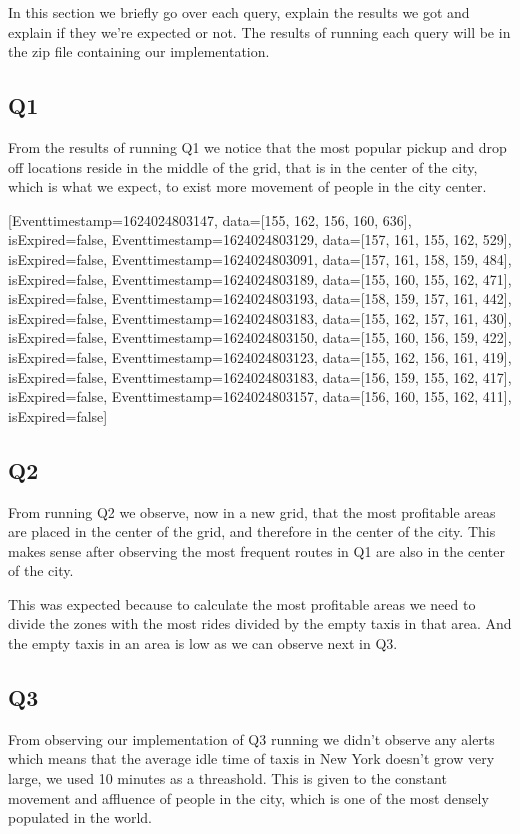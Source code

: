 In this section we briefly go over each query, explain the results we got and explain if they we're expected or not. The results of running each query will be in the zip file containing our implementation.

\subsection{Q1}
From the results of running Q1 we notice that the most popular pickup and drop off locations reside in the middle of the grid, that is in the center of the city, which is what we expect, to exist more movement of people in the city center.

[Event{timestamp=1624024803147, data=[155, 162, 156, 160, 636], isExpired=false}, 
Event{timestamp=1624024803129, data=[157, 161, 155, 162, 529], isExpired=false}, 
Event{timestamp=1624024803091, data=[157, 161, 158, 159, 484], isExpired=false}, 
Event{timestamp=1624024803189, data=[155, 160, 155, 162, 471], isExpired=false}, 
Event{timestamp=1624024803193, data=[158, 159, 157, 161, 442], isExpired=false}, 
Event{timestamp=1624024803183, data=[155, 162, 157, 161, 430], isExpired=false}, 
Event{timestamp=1624024803150, data=[155, 160, 156, 159, 422], isExpired=false}, 
Event{timestamp=1624024803123, data=[155, 162, 156, 161, 419], isExpired=false}, 
Event{timestamp=1624024803183, data=[156, 159, 155, 162, 417], isExpired=false}, 
Event{timestamp=1624024803157, data=[156, 160, 155, 162, 411], isExpired=false}]

\subsection{Q2}
From running Q2 we observe, now in a new grid, that the most profitable areas are placed in the center of the grid, and therefore in the center of the city. This makes sense after observing the most frequent routes in Q1 are also in the center of the city.

This was expected because to calculate the most profitable areas we need to divide the zones with the most rides divided by the empty taxis in that area. And the empty taxis in an area is low as we can observe next in Q3.

\subsection{Q3}
From observing our implementation of Q3 running we didn't observe any alerts which means that the average idle time of taxis in New York doesn't grow very large, we used 10 minutes as a threashold. This is given to the constant movement and affluence of people in the city, which is one of the most densely populated in the world.

